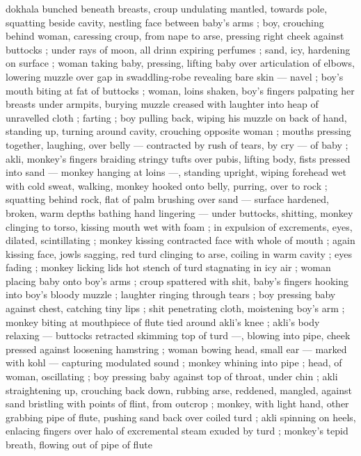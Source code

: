 dokhala bunched beneath breasts, croup undulating mantled, 
towards pole, squatting beside cavity, nestling face between baby's 
arms ; boy, crouching behind woman, caressing croup, from nape to 
arse, pressing right cheek against buttocks ; under rays of moon, all 
drinn expiring perfumes ; sand, icy, hardening on surface ; woman 
taking baby, pressing, lifting baby over articulation of elbows, 
lowering muzzle over gap in swaddling-robe revealing bare skin --- 
navel ; boy's mouth biting at fat of buttocks ; woman, loins shaken, 
boy's fingers palpating her breasts under armpits, burying muzzle 
creased with laughter into heap of unravelled cloth ; farting ; boy 
pulling back, wiping his muzzle on back of hand, standing up, turning 
around cavity, crouching opposite woman ; mouths pressing together, 
laughing, over belly --- contracted by rush of tears, by cry --- of 
baby ; akli, monkey's fingers braiding stringy tufts over pubis, lifting 
body, fists pressed into sand --- monkey hanging at loins ---, 
standing upright, wiping forehead wet with cold sweat, walking, 
monkey hooked onto belly, purring, over to rock ; squatting behind 
rock, flat of palm brushing over sand --- surface hardened, broken, 
warm depths bathing hand lingering --- under buttocks, shitting, 
monkey clinging to torso, kissing mouth wet with foam ; in expulsion 
of excrements, eyes, dilated, scintillating ; monkey kissing 
contracted face with whole of mouth ; again kissing face, jowls 
sagging, red turd clinging to arse, coiling in warm cavity ; eyes fading 
; monkey licking lids {\col} hot stench of turd stagnating in icy air ; woman 
placing baby onto boy's arms ; croup spattered with shit, baby's 
fingers hooking into boy's bloody muzzle ; laughter ringing through 
tears ; boy pressing baby against chest, catching tiny lips ; shit 
penetrating cloth, moistening boy's arm ; monkey biting at 
mouthpiece of flute tied around akli's knee ; akli's body relaxing --- 
buttocks retracted skimming top of turd ---, blowing into pipe, cheek 
pressed against loosening hamstring ; woman bowing head, small ear 
--- marked with kohl --- capturing modulated sound ; monkey 
whining into pipe ; head, of woman, oscillating ; boy pressing baby 
against top of throat, under chin ; akli straightening up, crouching 
back down, rubbing arse, reddened, mangled, against sand bristling 
with points of flint, from outcrop ; monkey, with light hand, other 
grabbing pipe of flute, pushing sand back over coiled turd ; akli 
spinning on heels, enlacing fingers over halo of excremental steam 
exuded by turd ; monkey's tepid breath, flowing out of pipe of flute 
